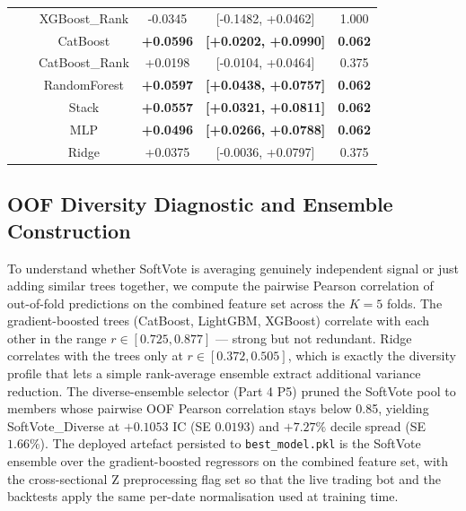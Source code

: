 \documentclass[10pt,journal,compsoc]{IEEEtran}
\begin{document}
\begin{table}[tbp]
\begin{tabular}{llcccc}
               &                          & XGBoost\_Rank      & -0.0345                & [-0.1482, +0.0462]               & 1.000      \\
               &                          & CatBoost           & \textbf{+0.0596}       & \textbf{[+0.0202, +0.0990]}      & \textbf{0.062} \\
               &                          & CatBoost\_Rank     & +0.0198                & [-0.0104, +0.0464]               & 0.375      \\
               &                          & RandomForest       & \textbf{+0.0597}       & \textbf{[+0.0438, +0.0757]}      & \textbf{0.062} \\
               &                          & Stack              & \textbf{+0.0557}       & \textbf{[+0.0321, +0.0811]}      & \textbf{0.062} \\
               &                          & MLP                & \textbf{+0.0496}       & \textbf{[+0.0266, +0.0788]}      & \textbf{0.062} \\
               &                          & Ridge              & +0.0375                & [-0.0036, +0.0797]               & 0.375      \\
\bottomrule
\end{tabular}
\end{table}

\subsection{OOF Diversity Diagnostic and Ensemble Construction}
To understand whether SoftVote is averaging genuinely independent signal or just adding similar trees together, we compute the pairwise Pearson correlation of out-of-fold predictions on the combined feature set across the $K=5$ folds. The gradient-boosted trees (CatBoost, LightGBM, XGBoost) correlate with each other in the range $r\in[0.725, 0.877]$ — strong but not redundant. Ridge correlates with the trees only at $r\in[0.372, 0.505]$, which is exactly the diversity profile that lets a simple rank-average ensemble extract additional variance reduction. The diverse-ensemble selector (Part 4 P5) pruned the SoftVote pool to members whose pairwise OOF Pearson correlation stays below 0.85, yielding SoftVote\_Diverse at $+0.1053$ IC (SE $0.0193$) and $+7.27\%$ decile spread (SE $1.66\%$). The deployed artefact persisted to \texttt{best\_model.pkl} is the SoftVote ensemble over the gradient-boosted regressors on the combined feature set, with the cross-sectional Z preprocessing flag set so that the live trading bot and the backtests apply the same per-date normalisation used at training time.
\end{document}
